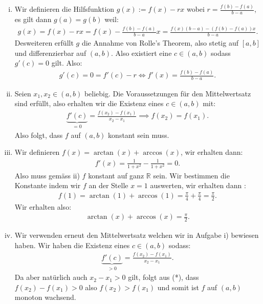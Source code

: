 \documentclass[a4paper, 20]{exam}
\begin{document}
\begin{solution}
\begin{enumerate}[i)]
\item Wir definieren die Hilfsfunktion $g(x):= f(x)-rx$ wobei $r= \frac{f(b)-f(a)}{b-a}$, es gilt dann $g(a)=g(b)$ weil:
\begin{align*}
g(x)=f(x)-rx= f(x)- \frac{f(b)-f(a)}{b-a}x  =  \frac{f(x)(b-a)- (f(b)-f(a))x}{b-a}. 
\end{align*}
Desweiteren erfüllt $g$ die Annahme von Rolle's Theorem, also stetig auf $[a,b]$ und differenzierbar auf $(a,b)$. Also existiert eine $c \in (a,b)$ sodass $g'(c)=0$ gilt. Also:
\begin{align*}
g'(c)=0 = f'(c)-r \iff f'(x) = \frac{f(b)-f(a)}{b-a}.
\end{align*}
\item Seien $x_1,x_2 \in (a,b)$ beliebig. Die Voraussetzungen für den Mittelwertsatz sind erfüllt,  also erhalten wir die Existenz eines $c \in (a,b)$ mit: 
\begin{align*}
\underbrace{f'(c)}_{=0} = \frac{f(x_2)-f(x_1)}{x_2-x_1} \implies f(x_2)=f(x_1).
\end{align*}
Also folgt, dass $f$ auf $(a,b)$ konstant sein muss. 
\item Wir definieren $f(x)= \arctan (x) + \arccos(x)$, wir erhalten dann:
\begin{align*}
f'(x)= \frac{1}{1+x^2 }- \frac{1}{1+x^2}=0.
\end{align*}
Also muss gemäss ii) $f$ konstant auf ganz $\mathbb{R}$ sein. Wir bestimmen die Konstante indem wir $f$ an der Stelle $x=1$ auswerten, wir erhalten dann :
\begin{align*}
f(1)=\arctan(1) + \arccos(1)= \frac{\pi}{4}+ \frac{\pi}{4} = \frac{\pi}{2}.
\end{align*}
Wir erhalten also:
\begin{align*}
\arctan(x) + \arccos(x) = \frac{\pi}{2}.
\end{align*}
\item Wir verwenden erneut den Mittelwertsatz welchen wir in Aufgabe i) bewiesen haben. Wir haben die Existenz eines $c \in (a,b)$ sodass: 
\begin{align*}
\underbrace{f'(c)}_{>0}= \frac{f(x_2)-f(x_1)}{x_2-x_1} \tag{*}.
\end{align*}
Da aber natürlich auch $x_2-x_1>0$ gilt, folgt aus (*), dass $f(x_2)-f(x_1)>0$ also $f(x_2)>f(x_1)$ und somit ist $f$ auf $(a,b)$ monoton wachsend. 
\end{enumerate}
\end{solution}
\end{document}
